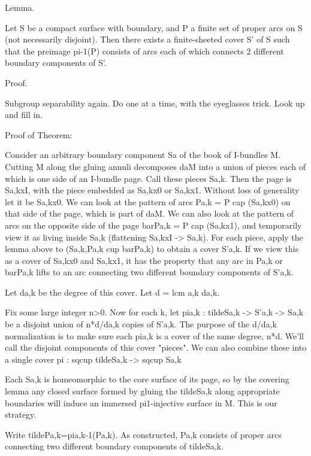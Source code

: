 \documentclass[12pt]{amsart}
\theoremstyle{definition}
\theoremstyle{remark}
\begin{document}
Lemma.

Let S be a compact surface with boundary, and P a finite set of proper arcs on
S (not necessarily disjoint).  Then there exists a finite-sheeted cover S' of
S such that the preimage pi-1(P) consists of arcs each of which connects
2 different boundary components of S'.

Proof.

Subgroup separability again. Do one at a time, with the eyeglasses trick.  Look
up and fill in.

Proof of Theorem:

Consider an arbitrary boundary component Sa of the book of I-bundles M.
Cutting M along the gluing annuli decomposes daM into a union of pieces each of
which is one side of an I-bundle page. Call these pieces Sa,k. Then the page is
Sa,kxI, with the piece embedded as Sa,kx0 or Sa,kx1. Without loss of generality
let it be Sa,kx0. We can look at the pattern of arcs Pa,k = P cap (Sa,kx0) on
that side of the page, which is part of daM. We can also look at the pattern of
arcs on the opposite side of the page barPa,k = P cap (Sa,kx1), and temporarily
view it as living inside Sa,k (flattening Sa,kxI -> Sa,k).  For each piece,
apply the lemma above to (Sa,k,Pa,k cup barPa,k) to obtain a cover S'a,k. If we
view this as a cover of Sa,kx0 and Sa,kx1, it has the property that any arc in
Pa,k or barPa,k lifts to an arc connecting two different boundary components of
S'a,k.

Let da,k be the degree of this cover. Let d = lcm a,k da,k.

Fix some large integer n>0. Now for each k, let pia,k : tildeSa,k -> S'a,k ->
Sa,k be a disjoint union of n*d/da,k copies of S'a,k. The purpose of the d/da,k
normalization is to make sure each pia,k is a cover of the same degree, n*d.
We'll call the disjoint components of this cover "pieces". We can also combine
these into a single cover pi : sqcup tildeSa,k -> sqcup Sa,k

Each Sa,k is homeomorphic to the core surface of its page, so by the covering
lemma any closed surface formed by gluing the tildeSa,k along appropriate
boundaries will induce an immersed pi1-injective surface in M. This is our
strategy.

Write tildePa,k=pia,k-1(Pa,k). As constructed, Pa,k consists of proper arcs
connecting two different boundary components of tildeSa,k.
\end{document}
